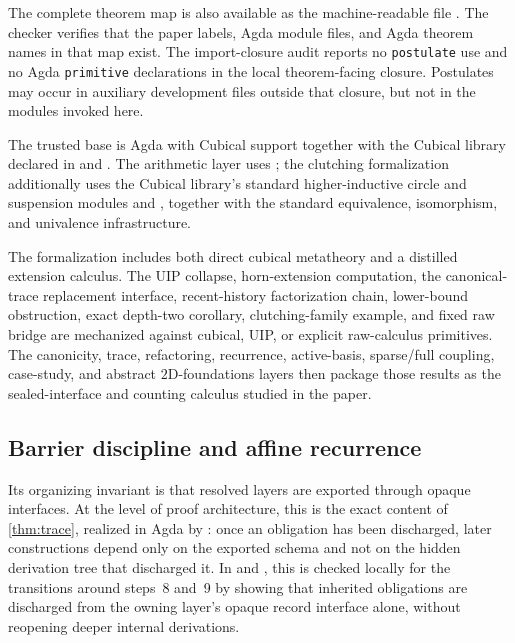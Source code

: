 \documentclass{lmcs}
\begin{document}
The complete theorem map is also available as the machine-readable file
. The checker 
verifies that the paper labels, Agda module files, and Agda theorem names in
that map exist. The import-closure audit
 reports no \texttt{postulate} use and no
Agda \texttt{primitive} declarations in the local theorem-facing closure.
Postulates may occur in auxiliary development files outside that closure, but
not in the modules invoked here.

The trusted base is Agda with Cubical support together with the Cubical library declared in  and . The arithmetic layer uses ; the clutching formalization additionally uses the Cubical library's standard higher-inductive circle and suspension modules  and , together with the standard equivalence, isomorphism, and univalence infrastructure.

The formalization includes both direct cubical metatheory and a distilled extension calculus. The UIP collapse, horn-extension computation, the canonical-trace replacement interface, recent-history factorization chain, lower-bound obstruction, exact depth-two corollary, clutching-family example, and fixed raw bridge are mechanized against cubical, UIP, or explicit raw-calculus primitives. The canonicity, trace, refactoring, recurrence, active-basis, sparse/full coupling, case-study, and abstract $2$D-foundations layers then package those results as the sealed-interface and counting calculus studied in the paper.

\subsection{Barrier discipline and affine recurrence}

Its organizing invariant is that resolved layers are exported through opaque interfaces. At the level of proof architecture, this is the exact content of \autoref{thm:trace}, realized in Agda by : once an obligation has been discharged, later constructions depend only on the exported schema and not on the hidden derivation tree that discharged it. In  and , this is checked locally for the transitions around steps~8 and~9 by showing that inherited obligations are discharged from the owning layer's opaque record interface alone, without reopening deeper internal derivations.
\end{document}
